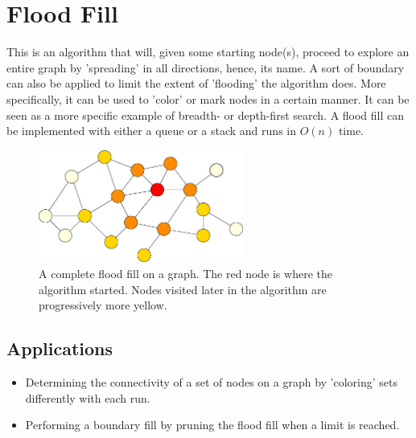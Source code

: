 \section{Flood Fill}

This is an algorithm that will, given some starting node(s), proceed to explore an entire graph by 'spreading' in all directions, hence, its name.
A sort of boundary can also be applied to limit the extent of 'flooding' the algorithm does.
More specifically, it can be used to 'color' or mark nodes in a certain manner.
It can be seen as a more specific example of breadth- or depth-first search.
A flood fill can be implemented with either a queue or a stack and runs in $O(n)$ time.

\begin{figure}[h]
    \centering
    \includegraphics[width=0.6\textwidth]{./algorithms/flood-fill/partial-ff}
    \caption{\small A complete flood fill on a graph.
      The red node is where the algorithm started.
      Nodes visited later in the algorithm are progressively more yellow.}
\end{figure}

\subsection{Applications}

\begin{itemize}
    \item Determining the connectivity of a set of nodes on a graph by 'coloring' sets differently with each run.
    \item Performing a boundary fill by pruning the flood fill when a limit is reached.
\end{itemize}